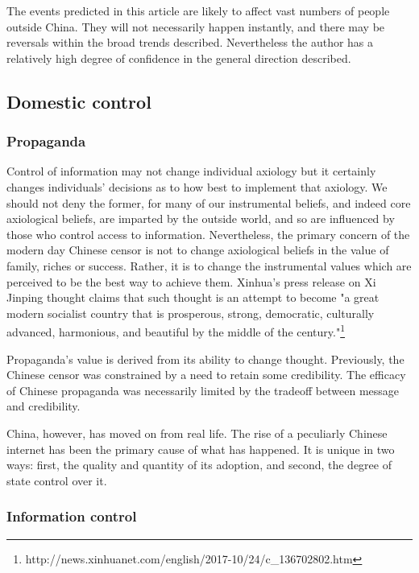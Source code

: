 	The events predicted in this article are likely to affect vast numbers
	of people outside China. They will not necessarily happen instantly, and
	there may be reversals within the broad trends described. Nevertheless
	the author has a relatively high degree of confidence in the general
	direction described.


\subsection{Domestic control}\label{domestic-control}

\subsubsection{Propaganda}\label{propaganda}


	Control of information may not change individual axiology but it
	certainly changes individuals' decisions as to how best to implement
	that axiology. We should not deny the former, for many of our
	instrumental beliefs, and indeed core axiological beliefs, are imparted
	by the outside world, and so are influenced by those who control access
	to information. Nevertheless, the primary concern of the modern day
	Chinese censor is not to change axiological beliefs in the value of
	family, riches or success. Rather, it is to change the instrumental
	values which are perceived to be the best way to achieve them. Xinhua's
	press release on Xi Jinping thought claims that such thought is an
	attempt to become "a great modern socialist country that is prosperous,
	strong, democratic, culturally advanced, harmonious, and beautiful by
	the middle of the century."\footnote{http://news.xinhuanet.com/english/2017-10/24/c\_136702802.htm}

	Propaganda's value is derived from its ability to change thought.
	Previously, the Chinese censor was constrained by a need to retain some
	credibility. The efficacy of Chinese propaganda was necessarily limited
	by the tradeoff between message and credibility.

	China, however, has moved on from real life. The rise of a peculiarly
	Chinese internet has been the primary cause of what has happened. It is
	unique in two ways: first, the quality and quantity of its adoption, and
	second, the degree of state control over it.


\subsubsection{Information control}\label{information-control}


